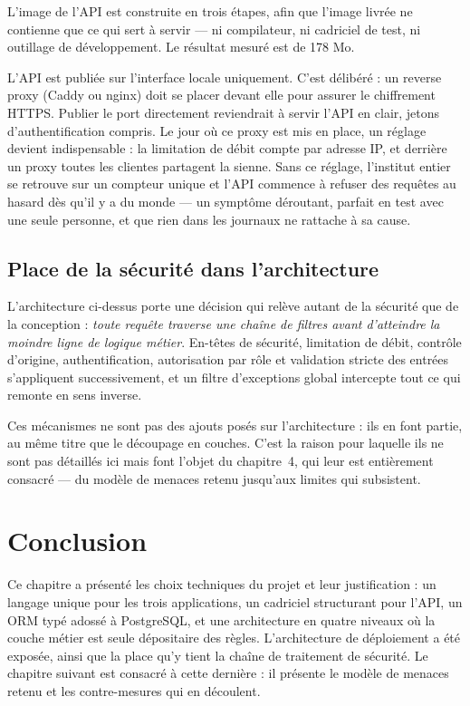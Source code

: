 L'image de l'API est construite en trois étapes, afin que l'image livrée ne
contienne que ce qui sert à servir --- ni compilateur, ni cadriciel de test,
ni outillage de développement. Le résultat mesuré est de 178 Mo.

\begin{attention}
L'API est publiée sur l'interface locale uniquement. C'est délibéré : un
reverse proxy (Caddy ou nginx) doit se placer devant elle pour assurer le
chiffrement HTTPS. Publier le port directement reviendrait à servir l'API en
clair, jetons d'authentification compris. Le jour où ce proxy est mis en place,
un réglage devient indispensable : la limitation de débit compte par adresse
IP, et derrière un proxy toutes les clientes partagent la sienne. Sans ce
réglage, l'institut entier se retrouve sur un compteur unique et l'API commence
à refuser des requêtes au hasard dès qu'il y a du monde --- un symptôme
déroutant, parfait en test avec une seule personne, et que rien dans les
journaux ne rattache à sa cause.
\end{attention}

\subsection{Place de la sécurité dans l'architecture}

L'architecture ci-dessus porte une décision qui relève autant de la sécurité
que de la conception : \emph{toute requête traverse une chaîne de filtres
avant d'atteindre la moindre ligne de logique métier}. En-têtes de sécurité,
limitation de débit, contrôle d'origine, authentification, autorisation par
rôle et validation stricte des entrées s'appliquent successivement, et un
filtre d'exceptions global intercepte tout ce qui remonte en sens inverse.

Ces mécanismes ne sont pas des ajouts posés sur l'architecture : ils en font
partie, au même titre que le découpage en couches. C'est la raison pour
laquelle ils ne sont pas détaillés ici mais font l'objet du chapitre~4, qui
leur est entièrement consacré --- du modèle de menaces retenu jusqu'aux limites
qui subsistent.

\section*{Conclusion}

Ce chapitre a présenté les choix techniques du projet et leur justification :
un langage unique pour les trois applications, un cadriciel structurant pour
l'API, un ORM typé adossé à PostgreSQL, et une architecture en quatre niveaux
où la couche métier est seule dépositaire des règles. L'architecture de déploiement a été
exposée, ainsi que la place qu'y tient la chaîne de traitement de sécurité.
Le chapitre suivant est consacré à cette dernière : il présente le modèle de
menaces retenu et les contre-mesures qui en découlent.
